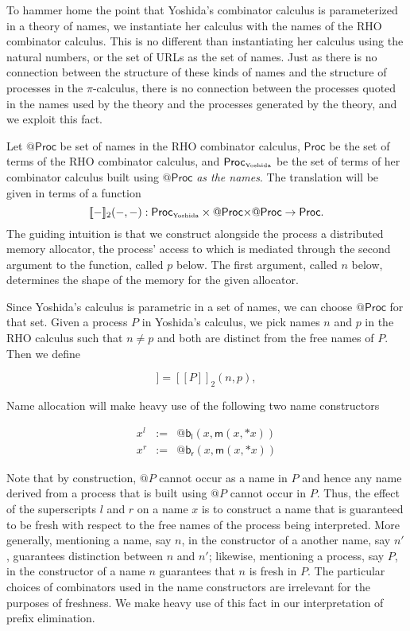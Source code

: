 \documentclass[submission,copyright,creativecommons]{eptcs}
\makeatletter
\newcommand{\pic}{$\pi$-calculus}
\newcommand{\ldb}{[\![}
\newcommand{\rdb}{]\!]}
\newcommand{\quotep}[1]{\mathsf{@}#1}
\newcommand{\meaningof}[1]{\ldb #1 \rdb}
\newcommand{\Proc}{\mathsf{Proc}}
\newcommand{\QProc}{\quotep{\mathsf{Proc}}}
\newcommand{\red}{\rightarrow}
\theoremstyle{definition}
\theoremstyle{remark}
\theoremstyle{remark}
\makeatother
\begin{document}
To hammer home the point that Yoshida's combinator calculus is
parameterized in a theory of names, we instantiate her calculus with
the names of the RHO combinator calculus. This is no different than
instantiating her calculus using the natural numbers, or the set of URLs as the
set of names. Just as there is no connection between the structure of
these kinds of names and the structure of processes in the {\pic},
there is no connection between the processes quoted in the names used
by the theory and the processes generated by the theory, and we
exploit this fact.

Let $\QProc$ be set of names in the RHO combinator calculus, $\Proc$
be the set of terms of the RHO combinator calculus, and
$\Proc_{\mbox{\tiny Yoshida}}$ be the set of terms of her combinator
calculus built using $\QProc$ \emph{as the names}. The translation will be
given in terms of a function \[\meaningof{-}_2( -, - ) : 
    \Proc_{\mbox{\tiny Yoshida}} \times \QProc {\times} \QProc \red \Proc.\] 
The guiding intuition is that we construct alongside the process a distributed memory
allocator, the process' access to which is mediated through the second argument
to the function, called $p$ below. The first argument, called $n$ below, determines the shape of the memory for the given allocator.

Since Yoshida's calculus is parametric in a set of names, we can
choose $\QProc$ for that set.  Given a process $P$ in Yoshida's
calculus, we pick names $n$ and $p$ in the RHO calculus such that $n \neq p$
and both are distinct from the free names of $P$.  Then we define

\begin{equation*}
  \meaningof{P} = \meaningof{P}_2(n, p),
\end{equation*}

Name allocation will make heavy use of the following two name
constructors

\begin{eqnarray*}
  x^l & := & \quotep{\mathsf{b}_{\mathsf{l}}(x,\mathsf{m}(x,*x))} \\
  x^r & := & \quotep{\mathsf{b}_{\mathsf{r}}(x,\mathsf{m}(x,*x))}
\end{eqnarray*}

Note that by construction, $\quotep{P}$ cannot occur as a name in $P$
and hence any name derived from a process that is built using
$\quotep{P}$ cannot occur in $P$. Thus, the effect of the superscripts
$l$ and $r$ on a name $x$ is to construct a name that is guaranteed to
be fresh with respect to the free names of the process being
interpreted. More generally, mentioning a name, say $n$, in the
constructor of a another name, say $n'$, guarantees distinction
between $n$ and $n'$; likewise, mentioning a process, say $P$, in the
constructor of a name $n$ guarantees that $n$ is fresh in $P$. The
particular choices of combinators used in the name
constructors are irrelevant for the purposes of freshness. We
make heavy use of this fact in our interpretation of prefix
elimination.
\end{document}

